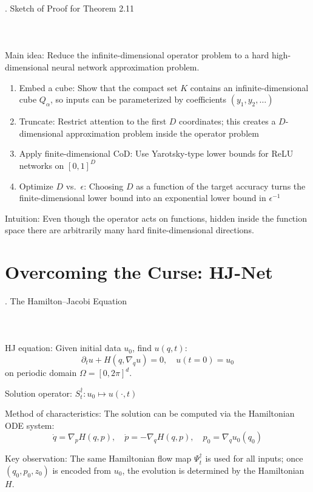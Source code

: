 \documentclass{beamer}
\def\b{\color{blue}}
\def\r{\color{red}}
\begin{document}
\begin{frame}{\thesection. Sketch of Proof for Theorem 2.11}
\framesubtitle{$\quad$}
{\Large {\b Main idea}: Reduce the infinite-dimensional operator problem to a hard high-dimensional neural network approximation problem.}
\medskip

{\Large
\begin{enumerate}
    \item {\b Embed a cube}: Show that the compact set $ K $ contains an infinite-dimensional cube $ Q_\alpha $, so inputs can be parameterized by coefficients $ (y_1,y_2,\dots) $
    \item {\b Truncate}: Restrict attention to the first $ D $ coordinates; this creates a $ D $-dimensional approximation problem inside the operator problem
    \item {\b Apply finite-dimensional CoD}: Use Yarotsky-type lower bounds for ReLU networks on $ [0,1]^D $
    \item {\b Optimize $ D $ vs.\ $ \epsilon $}: Choosing $ D $ as a function of the target accuracy turns the finite-dimensional lower bound into an {\r exponential} lower bound in $ \epsilon^{-1} $
\end{enumerate}
}
\medskip

{\Large {\b Intuition}: Even though the operator acts on functions, hidden inside the function space there are arbitrarily many hard finite-dimensional directions.}

\end{frame}

\section{{\Large Overcoming the Curse: HJ-Net}}

\begin{frame}{\thesection. The Hamilton--Jacobi Equation}
\framesubtitle{$\quad$}
{\Large {\b HJ equation}: Given initial data $ u_0 $, find $ u(q,t) $:
$$
\partial_t u + H(q, \nabla_q u) = 0, \quad u(t=0) = u_0
$$
on periodic domain $ \Omega = [0, 2\pi]^d $.
}
\medskip

{\Large {\b Solution operator}: $ S_t^\dagger : u_0 \mapsto u(\cdot, t) $}
\medskip

{\Large {\b Method of characteristics}: The solution can be computed via the Hamiltonian ODE system:
$$
\dot{q} = \nabla_p H(q,p), \quad \dot{p} = -\nabla_q H(q,p), \quad p_0 = \nabla_q u_0(q_0)
$$
}
\medskip

{\Large {\b Key observation}: The same Hamiltonian flow map $ \Psi_t^\dagger $ is used for all inputs; once $ (q_0,p_0,z_0) $ is encoded from $ u_0 $, the evolution is determined by the Hamiltonian $ H $.}

\end{frame}
\end{document}
